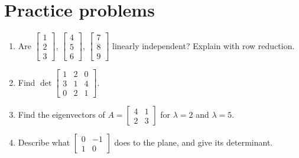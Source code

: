 \documentclass[11pt]{article}
\begin{document}
\section{Practice problems}

\begin{enumerate}[label=\arabic*.]
  \item Are $\begin{bmatrix}1\\2\\3\end{bmatrix}$, $\begin{bmatrix}4\\5\\6\end{bmatrix}$,
        $\begin{bmatrix}7\\8\\9\end{bmatrix}$ linearly independent? Explain with row reduction.
  \item Find $\det\begin{bmatrix} 1 & 2 & 0 \\ 3 & 1 & 4 \\ 0 & 2 & 1\end{bmatrix}$.
  \item Find the eigenvectors of $A = \begin{bmatrix} 4 & 1 \\ 2 & 3 \end{bmatrix}$ for $\lambda = 2$ and $\lambda = 5$.
  \item Describe what $\begin{bmatrix} 0 & -1 \\ 1 & 0\end{bmatrix}$ does to the plane, and give its determinant.
\end{enumerate}
\end{document}
